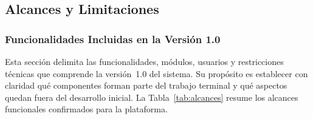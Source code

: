 \newpage

\subsection{Alcances y Limitaciones}

\subsubsection{Funcionalidades Incluidas en la Versión 1.0}

Esta sección delimita las funcionalidades, módulos, usuarios y restricciones técnicas que
comprende la versión~1.0 del sistema. Su propósito es establecer con claridad qué componentes
forman parte del trabajo terminal y qué aspectos quedan fuera del desarrollo inicial. La
Tabla~\ref{tab:alcances} resume los alcances funcionales confirmados para la plataforma.

